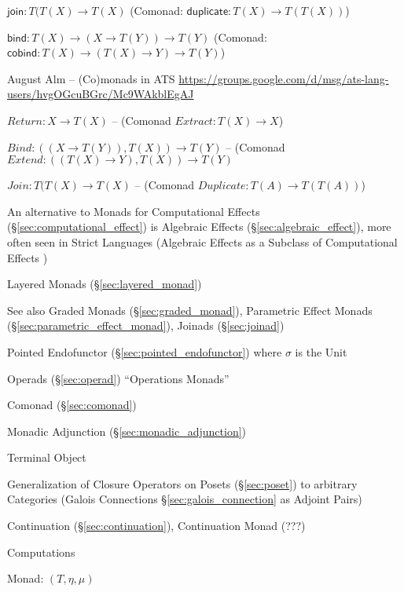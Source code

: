 $\mathsf{join} : T(T(X) \rightarrow T(X)$ (Comonad:
$\textsf{duplicate} : T(X) \rightarrow T(T(X))$)

$\mathsf{bind} : T(X) \rightarrow (X \rightarrow T(Y)) \rightarrow
T(Y)$ (Comonad: $\mathsf{cobind} : T(X) \rightarrow (T(X) \rightarrow
Y) \rightarrow T(Y)$)


\asterism


August Alm -- (Co)monads in ATS
\url{https://groups.google.com/d/msg/ats-lang-users/hvgOGcuBGrc/Mc9WAkblEgAJ}

$Return : X \rightarrow T(X)$ -- (Comonad $Extract : T(X) \rightarrow
X$)

$Bind : ((X \rightarrow T(Y)), T(X)) \rightarrow T(Y)$ -- (Comonad
$Extend : ((T(X) \rightarrow Y), T(X)) \rightarrow T(Y)$

$Join : T(T(X) \rightarrow T(X)$ -- (Comonad $Duplicate : T(A)
\rightarrow T(T(A))$)


\asterism


An alternative to Monads for Computational Effects
(\S\ref{sec:computational_effect}) is Algebraic Effects
(\S\ref{sec:algebraic_effect}), more often seen in Strict Languages
(Algebraic Effects as a Subclass of Computational Effects
\cite{plotkin-pretnar09})

Layered Monads (\S\ref{sec:layered_monad}) \cite{filinski99}

\fist See also Graded Monads (\S\ref{sec:graded_monad}), Parametric
Effect Monads (\S\ref{sec:parametric_effect_monad}), Joinads
(\S\ref{sec:joinad})

Pointed Endofunctor (\S\ref{sec:pointed_endofunctor}) where $\sigma$
is the Unit

Operads (\S\ref{sec:operad}) ``Operations Monads''


\asterism


Comonad (\S\ref{sec:comonad})

Monadic Adjunction (\S\ref{sec:monadic_adjunction})

Terminal Object %

Generalization of Closure Operators on Posets (\S\ref{sec:poset}) to
arbitrary Categories (Galois Connections \S\ref{sec:galois_connection}
as Adjoint Pairs)

Continuation (\S\ref{sec:continuation}), Continuation Monad (???) %


\asterism


Computations

Monad: $(T,\eta,\mu)$

